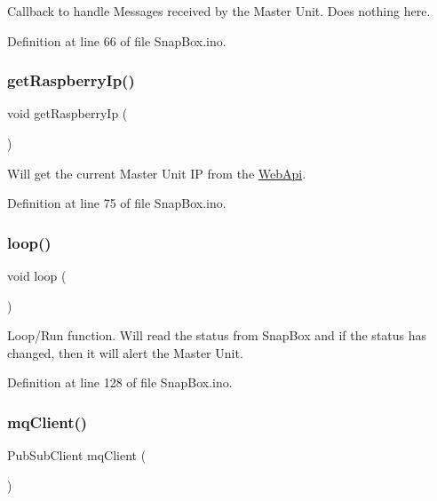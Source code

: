 Callback to handle Messages received by the Master Unit. Does nothing here. 

Definition at line 66 of file Snap\+Box.\+ino.

\mbox{\label{_snap_box_8ino_a7a69432900bad935bd00eb0a9d4bf61f}} 
\subsubsection{\texorpdfstring{get\+Raspberry\+Ip()}{getRaspberryIp()}}
{\footnotesize\ttfamily void get\+Raspberry\+Ip (\begin{DoxyParamCaption}{ }\end{DoxyParamCaption})}

Will get the current Master Unit IP from the \mbox{\hyperlink{namespace_web_api}{Web\+Api}}. 

Definition at line 75 of file Snap\+Box.\+ino.

\mbox{\label{_snap_box_8ino_afe461d27b9c48d5921c00d521181f12f}} 
\subsubsection{\texorpdfstring{loop()}{loop()}}
{\footnotesize\ttfamily void loop (\begin{DoxyParamCaption}{ }\end{DoxyParamCaption})}

Loop/\+Run function. Will read the status from Snap\+Box and if the status has changed, then it will alert the Master Unit. 

Definition at line 128 of file Snap\+Box.\+ino.

\mbox{\label{_snap_box_8ino_a3723ecd4627fe1acd7f94dd266f1105a}} 
\subsubsection{\texorpdfstring{mq\+Client()}{mqClient()}}
{\footnotesize\ttfamily Pub\+Sub\+Client mq\+Client (\begin{DoxyParamCaption}\item[{\mbox{\hyperlink{_snap_box_8ino_abd77e757e4b3bb6f1e4b42b21ea9e040}{esp\+Client}}}]{ }\end{DoxyParamCaption})}

